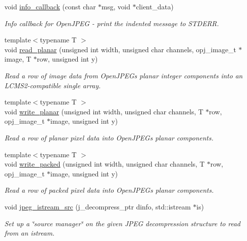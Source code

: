 \begin{DoxyCompactItemize}
void \hyperlink{namespace_photo_finish_a15b915c1ad42e83a12e30b6b1fd36785}{info\+\_\+callback} (const char $\ast$msg, void $\ast$client\+\_\+data)
\begin{DoxyCompactList}\small\item\em Info callback for Open\+J\+P\+EG -\/ print the indented message to S\+T\+D\+E\+RR. \end{DoxyCompactList}\item 
{\footnotesize template$<$typename T $>$ }\\void \hyperlink{namespace_photo_finish_a10db9072258646ff5fac41ce9bd1ee52}{read\+\_\+planar} (unsigned int width, unsigned char channels, opj\+\_\+image\+\_\+t $\ast$image, T $\ast$row, unsigned int y)
\begin{DoxyCompactList}\small\item\em Read a row of image data from Open\+J\+P\+EG\textquotesingle{}s planar integer components into an L\+C\+M\+S2-\/compatible single array. \end{DoxyCompactList}\item 
{\footnotesize template$<$typename T $>$ }\\void \hyperlink{namespace_photo_finish_a8ac95b8e0f1442d867620a2af03b193a}{write\+\_\+planar} (unsigned int width, unsigned char channels, T $\ast$row, opj\+\_\+image\+\_\+t $\ast$image, unsigned int y)
\begin{DoxyCompactList}\small\item\em Read a row of planar pixel data into Open\+J\+P\+EG\textquotesingle{}s planar components. \end{DoxyCompactList}\item 
{\footnotesize template$<$typename T $>$ }\\void \hyperlink{namespace_photo_finish_a5935e449413495c7af9504e518d0921b}{write\+\_\+packed} (unsigned int width, unsigned char channels, T $\ast$row, opj\+\_\+image\+\_\+t $\ast$image, unsigned int y)
\begin{DoxyCompactList}\small\item\em Read a row of packed pixel data into Open\+J\+P\+EG\textquotesingle{}s planar components. \end{DoxyCompactList}\item 
void \hyperlink{namespace_photo_finish_a18ffc326d36fb31d16a6468b4bfc4715}{jpeg\+\_\+istream\+\_\+src} (j\+\_\+decompress\+\_\+ptr dinfo, std\+::istream $\ast$is)
\begin{DoxyCompactList}\small\item\em Set up a \char`\"{}source manager\char`\"{} on the given J\+P\+EG decompression structure to read from an istream. \end{DoxyCompactList}\item 

\end{DoxyCompactItemize}
